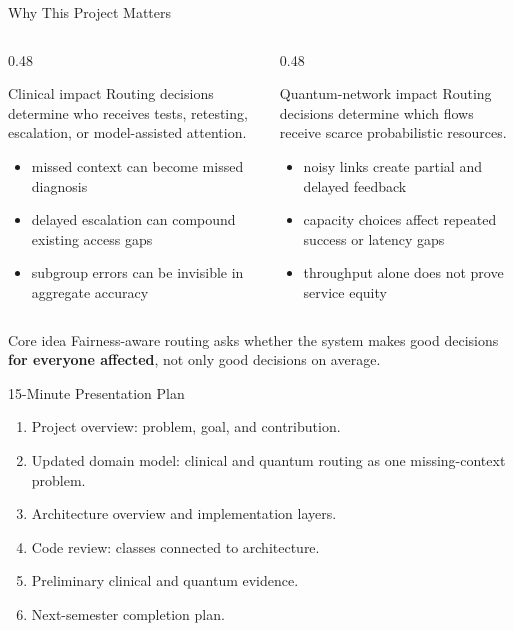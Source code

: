 \begin{frame}{Why This Project Matters}
\begin{columns}[T]
\begin{column}{0.48\textwidth}
\begin{block}{Clinical impact}
Routing decisions determine who receives tests, retesting, escalation, or model-assisted attention.
\end{block}
\begin{itemize}
    \item missed context can become missed diagnosis
    \item delayed escalation can compound existing access gaps
    \item subgroup errors can be invisible in aggregate accuracy
\end{itemize}
\end{column}
\begin{column}{0.48\textwidth}
\begin{block}{Quantum-network impact}
Routing decisions determine which flows receive scarce probabilistic resources.
\end{block}
\begin{itemize}
    \item noisy links create partial and delayed feedback
    \item capacity choices affect repeated success or latency gaps
    \item throughput alone does not prove service equity
\end{itemize}
\end{column}
\end{columns}

\vspace{0.5em}
\begin{block}{Core idea}
Fairness-aware routing asks whether the system makes good decisions \textbf{for everyone affected}, not only good decisions on average.
\end{block}
\end{frame}

\begin{frame}{15-Minute Presentation Plan}
\begin{enumerate}
    \item Project overview: problem, goal, and contribution.
    \item Updated domain model: clinical and quantum routing as one missing-context problem.
    \item Architecture overview and implementation layers.
    \item Code review: classes connected to architecture.
    \item Preliminary clinical and quantum evidence.
    \item Next-semester completion plan.
\end{enumerate}
\end{frame}
